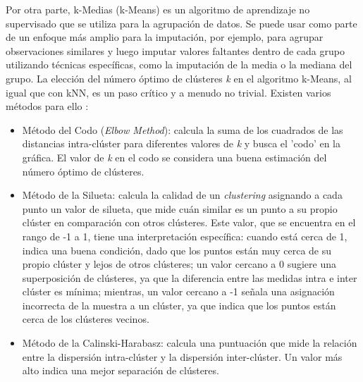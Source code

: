 Por otra parte, k-Medias (k-Means) es un algoritmo de aprendizaje no supervisado que se utiliza para la agrupación de datos. Se puede usar como parte de un enfoque más amplio para la imputación, por ejemplo, para agrupar observaciones similares y luego imputar valores faltantes dentro de cada grupo utilizando técnicas específicas, como la imputación de la media o la mediana del grupo. La elección del número óptimo de clústeres \textit{k} en el algoritmo k-Means, al igual que con kNN, es un paso crítico y a menudo no trivial. Existen varios métodos para ello \citep{bonaccorso2017machine}:

\begin{itemize}
	\item Método del Codo (\textit{Elbow Method}): calcula la suma de los cuadrados de las distancias intra-clúster para diferentes valores de \textit{k} y busca el 'codo' en la gráfica.  El valor de \textit{k} en el codo se considera una buena estimación del número óptimo de clústeres.
    \item Método de la Silueta: calcula la calidad de un \textit{clustering} asignando a cada punto un valor de silueta, que mide cuán similar es un punto a su propio clúster en comparación con otros clústeres. Este valor, que se encuentra en el rango de -1 a 1, tiene una interpretación específica: cuando está cerca de 1, indica una buena condición, dado que  los puntos están muy cerca de su propio clúster y lejos de otros clústeres; un valor cercano a 0 sugiere una superposición de clústeres, ya que la diferencia entre las medidas intra e inter clúster es mínima; mientras, un valor cercano a -1 señala una asignación incorrecta de la muestra a un clúster, ya que indica que los puntos están cerca de los clústeres vecinos.
    \item Método de la Calinski-Harabasz: calcula una puntuación que mide la relación entre la dispersión intra-clúster y la dispersión inter-clúster. Un valor más alto indica una mejor separación de clústeres.
\end{itemize}

